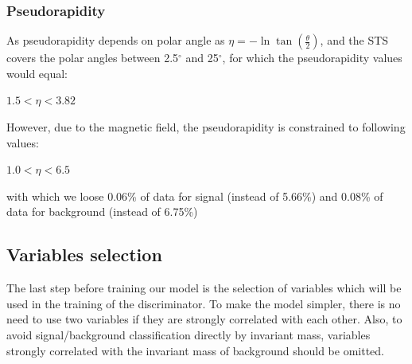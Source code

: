 \subsubsection{Pseudorapidity}
As pseudorapidity depends on polar angle as $\eta = -\ln{\tan(\frac{\theta}{2})}$, and the STS covers the polar angles between 2.5$^{\circ}$ and 25$^{\circ}$, for which the pseudorapidity values would equal:
\begin{center}
    $ 1.5< \eta < 3.82 $
\end{center}
However, due to the magnetic field, the pseudorapidity is constrained to following values:
\begin{center}
    $ 1.0< \eta < 6.5 $
\end{center}
with which we loose 0.06\% of data for signal (instead of 5.66\%) and 0.08\% of data for background (instead of 6.75\%)

\subsection{Variables selection}
The last step before training our model is the selection of variables which will be used in the training of the discriminator. To make the model simpler, there is no need to use two variables if they are strongly correlated with each other. Also, to avoid signal/background classification directly by invariant mass, variables strongly correlated with the invariant mass of background should be omitted.
